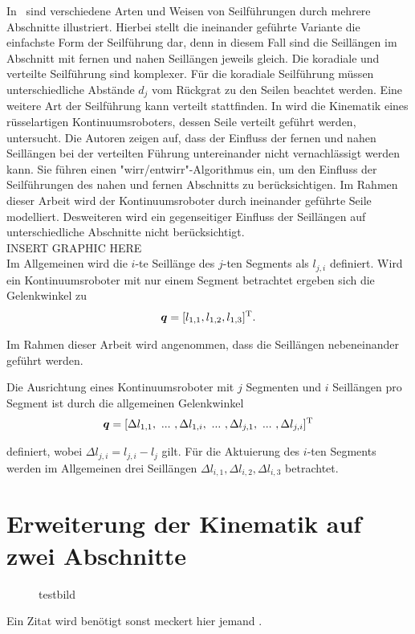 In~ sind verschiedene Arten und Weisen von Seilführungen durch mehrere Abschnitte illustriert. Hierbei stellt die ineinander geführte Variante die einfachste Form der Seilführung dar, denn in diesem Fall sind die Seillängen im Abschnitt mit fernen und nahen Seillängen jeweils gleich. Die koradiale und verteilte Seilführung sind komplexer. Für die koradiale Seilführung müssen unterschiedliche Abstände $d_j$ vom Rückgrat zu den Seilen beachtet werden. Eine weitere Art der Seilführung kann verteilt stattfinden. In \cite{JW06a} wird die Kinematik eines rüsselartigen Kontinuumsroboters, dessen Seile verteilt geführt werden, untersucht. Die Autoren zeigen auf, dass der Einfluss der fernen und nahen Seillängen bei der verteilten Führung untereinander nicht vernachlässigt werden kann. Sie führen einen "wirr/entwirr"-Algorithmus ein, um den Einfluss der Seilführungen des nahen und fernen Abschnitts zu berücksichtigen. Im Rahmen dieser Arbeit wird der Kontinuumsroboter durch ineinander geführte Seile modelliert. Desweiteren wird ein gegenseitiger Einfluss der Seillängen auf unterschiedliche Abschnitte nicht berücksichtigt. \\

INSERT GRAPHIC HERE \\

Im Allgemeinen wird die $i$-te Seillänge des $j$-ten Segments als $l_{j,i}$ definiert. Wird ein Kontinuumsroboter mit nur einem Segment betrachtet ergeben sich die Gelenkwinkel zu
%
\begin{align*}
\bm{q} = [l_{1,1}, l_{1,2}, l_{1,3}]^{\mathrm{T}}.
\end{align*}



Im Rahmen dieser Arbeit wird angenommen, dass die Seillängen nebeneinander geführt werden. 


Die Ausrichtung eines Kontinuumsroboter mit $j$ Segmenten und $i$ Seillängen pro Segment ist durch die allgemeinen Gelenkwinkel
%
\begin{align*}
\bm{q} = [\Delta l_{1,1},~...~,\Delta l_{1,i},~...~,\Delta l_{j,1},~...~, \Delta l_{j,i} ]^{\mathrm{T}}
\end{align*}

definiert, wobei $\Delta l_{j,i} = l_{j,i}-l_j$ gilt. 
Für die Aktuierung des $i$-ten Segments werden im Allgemeinen drei Seillängen $\Delta l_{i,1}, \Delta l_{i,2}, \Delta l_{i,3}$ betrachtet. 


\section{Erweiterung der Kinematik auf zwei Abschnitte}
\label{sec:erweiterungKinematik}

\begin{figure}
\def\svgwidth{\linewidth}

\caption{testbild}
\end{figure}





\vspace{2cm} Ein Zitat wird benötigt sonst meckert hier jemand \cite{Li17}.
